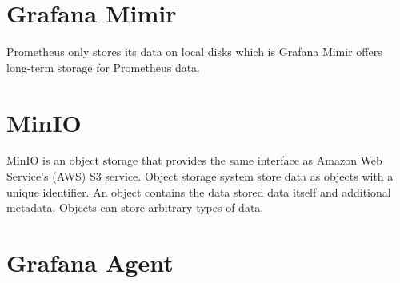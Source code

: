 \section{Grafana Mimir}
Prometheus only stores its data on local disks which is
Grafana Mimir offers long-term storage for Prometheus data.

\section{MinIO}
MinIO is an object storage that provides the same interface as Amazon Web Service's (AWS) S3 service.
Object storage system store data as objects with a unique identifier. An object contains the data stored
data itself and additional metadata. Objects can store arbitrary types of data.

\section{Grafana Agent}

